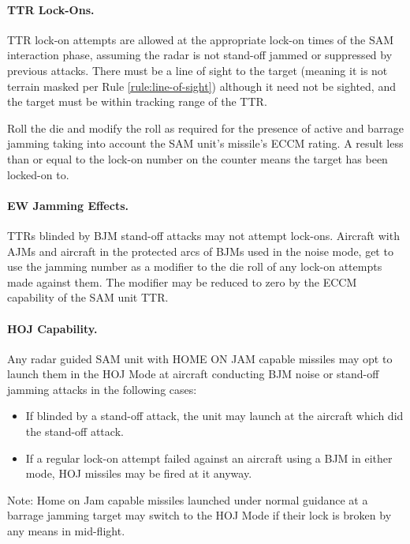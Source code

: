 \paragraph{TTR Lock-Ons.} TTR lock-on attempts are allowed at the appropriate lock-on times of the SAM interaction phase, assuming the radar is not stand-off jammed or suppressed by previous attacks. There must be a line of sight to the target (meaning it is not terrain masked per Rule \ref{rule:line-of-sight}) although it need not be sighted, and the target must be within tracking range of the TTR.

Roll the die and modify the roll as required for the presence of active and barrage jamming taking into account the SAM unit's missile's ECCM rating. A result less than or equal to the lock-on number on the counter means the target has been locked-on to.               

\paragraph{EW Jamming Effects.} TTRs blinded by BJM stand-off attacks may not attempt lock-ons. Aircraft with AJMs and aircraft in the protected arcs of BJMs used in the noise mode, get to use the jamming number as a modifier to the die roll of any lock-on attempts made against them. The modifier may be reduced to zero by the ECCM capability of the SAM unit TTR.

\paragraph{HOJ Capability.} Any radar guided SAM unit with HOME ON JAM capable missiles may opt to launch them in the HOJ Mode at aircraft conducting BJM noise or stand-off jamming attacks in the following cases:

\begin{itemize}

    \item If blinded by a stand-off attack, the unit may launch at the aircraft which did the stand-off attack.

    \item If a regular lock-on attempt failed against an aircraft using a BJM in either mode, HOJ missiles may be fired at it anyway.

\end{itemize}

Note: Home on Jam capable missiles launched under normal guidance at a barrage jamming target may switch to the HOJ Mode if their lock is broken by any means in mid-flight.

